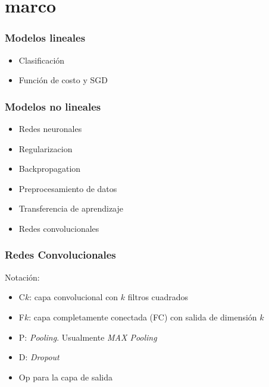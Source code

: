 \documentclass{beamer}
\begin{document}
\section{marco}
\begin{frame}
\frametitle{Modelos lineales}
\begin{itemize}
    \item Clasificación
    \item Función de costo y SGD 
\end{itemize}
\end{frame}




\begin{frame}
\frametitle{Modelos no lineales}
\begin{itemize}
    \item Redes neuronales
    \item Regularizacion
    \item Backpropagation
    \item Preprocesamiento de datos
    \item Transferencia de aprendizaje
    \item Redes convolucionales
\end{itemize}
\end{frame}





\begin{frame}
\frametitle{Redes Convolucionales}
Notación:
\begin{itemize}
    \item C\(k\): capa convolucional con \(k\) filtros cuadrados
    \item F\(k\): capa completamente conectada (FC) con salida de dimensión \(k\)
    \item P: \textit{Pooling}. Usualmente \textit{MAX Pooling}
    \item D: \textit{Dropout}
    \item Op para la capa de salida
\end{itemize}
\end{frame}
\end{document}
